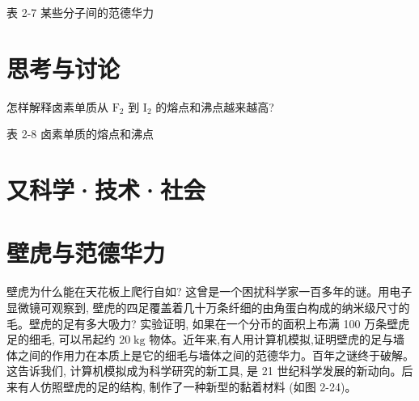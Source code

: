 \documentclass[10pt]{article}
\begin{document}
表 2-7 某些分子间的范德华力

\begin{center}
\end{center}

\section*{思考与讨论}

\begin{mdframed}

怎样解释卤素单质从 \({\mathrm{F}}_{2}\) 到 \({\mathrm{I}}_{2}\) 的熔点和沸点越来越高?

\end{mdframed}

表 2-8 卤素单质的熔点和沸点

\begin{center}
\end{center}

\section*{又科学·技术·社会}

\section*{壁虎与范德华力}

壁虎为什么能在天花板上爬行自如? 这曾是一个困扰科学家一百多年的谜。用电子显微镜可观察到, 壁虎的四足覆盖着几十万条纤细的由角蛋白构成的纳米级尺寸的毛。壁虎的足有多大吸力? 实验证明, 如果在一个分币的面积上布满 100 万条壁虎足的细毛, 可以吊起约 \({20}\mathrm{\;{kg}}\) 物体。近年来,有人用计算机模拟,证明壁虎的足与墙体之间的作用力在本质上是它的细毛与墙体之间的范德华力。百年之谜终于破解。这告诉我们, 计算机模拟成为科学研究的新工具, 是 21 世纪科学发展的新动向。后来有人仿照壁虎的足的结构, 制作了一种新型的黏着材料 (如图 2-24)。
\end{document}
